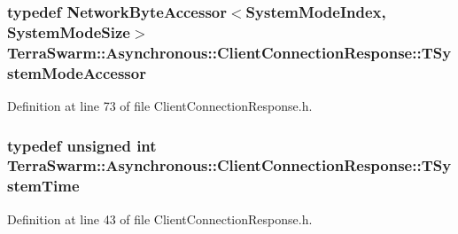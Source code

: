 \hypertarget{class_terra_swarm_1_1_asynchronous_1_1_client_connection_response_a248ac200307842dee28bd5b5cfec47da}{
\subsubsection[{T\-System\-Mode\-Accessor}]{\setlength{\rightskip}{0pt plus 5cm}typedef {\bf Network\-Byte\-Accessor}$<${\bf System\-Mode\-Index}, {\bf System\-Mode\-Size}$>$ {\bf Terra\-Swarm\-::\-Asynchronous\-::\-Client\-Connection\-Response\-::\-T\-System\-Mode\-Accessor}\hspace{0.3cm}{\ttfamily [private]}}}\label{class_terra_swarm_1_1_asynchronous_1_1_client_connection_response_a248ac200307842dee28bd5b5cfec47da}


Definition at line 73 of file Client\-Connection\-Response.\-h.

\hypertarget{class_terra_swarm_1_1_asynchronous_1_1_client_connection_response_ac32ae5e652874b024aae5ed2f816c155}{
\subsubsection[{T\-System\-Time}]{\setlength{\rightskip}{0pt plus 5cm}typedef unsigned int {\bf Terra\-Swarm\-::\-Asynchronous\-::\-Client\-Connection\-Response\-::\-T\-System\-Time}}}\label{class_terra_swarm_1_1_asynchronous_1_1_client_connection_response_ac32ae5e652874b024aae5ed2f816c155}


Definition at line 43 of file Client\-Connection\-Response.\-h.

